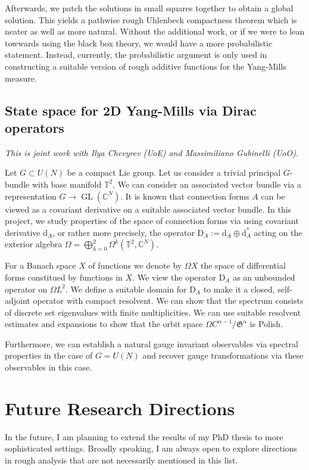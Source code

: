 \documentclass[12pt]{article}
\numberwithin{equation}{section}
\theoremstyle{definition}
\theoremstyle{remark}
\newcommand{\diff}{\mathrm{d}}
\newcommand{\1}{\mathbf 1}
\newcommand{\<}{\langle}
\renewcommand{\>}{\rangle}
\newcommand{\rmD}{\mathrm{D}}
\newcommand{\bT}{\mathbb T}
\begin{document}
Afterwards, we patch the solutions in small squares together to obtain a global solution. This yields a pathwise rough Uhlenbeck compactness theorem which is neater as well as more natural. Without the additional work, or if we were to lean towwards using the black box theory, we would have a more probabilistic statement. Instead, currently, the probabilistic argument  is only used in constructing a suitable version of rough additive functions for the Yang-Mills measure. 
%




\subsection{State space for 2D Yang-Mills via Dirac operators}
%
\textit{This is joint work with Ilya Chevyrev (UoE) and Massimiliano Gubinelli (UoO).} 

\medskip 

\noindent Let $G\subset U(N)$ be a compact Lie group. Let us consider a trivial principal $G$-bundle with base manifold $\bT^2$. We can consider an associated vector bundle via a representation $G\to \operatorname{GL}(\mathbb C^N)$. It is known that connection forms $A$ can be viewed as a covariant derivative on a suitable associated vector bundle. In this project, we study properties of the space of connection forms via using covariant derivative $\diff_A$, or rather more precisely, the operator  $\mathrm{D}_A:=\diff_A\oplus\diff_A^*$ acting on the exterior algebra $\Omega=\bigoplus_{k=0}^ 2\Omega^k(\bT^2,\mathbb C^N)$. 

For a Banach space $X$ of functions we denote by $\Omega X$ the space of differential forms constitued by functions in $X$. We view the operator $\rmD_A$ as an unbounded operator on $\Omega L^2$. We define a suitable domain for $\rmD_A$ to make it a closed, self-adjoint operator with compact resolvent. We can show that the spectrum consists of discrete set eigenvalues with finite multiplicities. We can use suitable resolvent estimates and expansions to show that the orbit space $\Omega C^{\alpha-1}/\mathfrak G^\alpha$ is Polish.

Furthermore, we can establish a natural gauge invariant observables via spectral properties  in the case of $G=U(N)$ and recover gauge transformations via these observables in this case.  



\section{Future Research Directions}
In the future, I am planning to extend the results of my PhD thesis to more sophisticated settings. Broadly speaking, I am always open to explore directions in rough analysis that are not necessarily mentioned in this list. 
\end{document}
